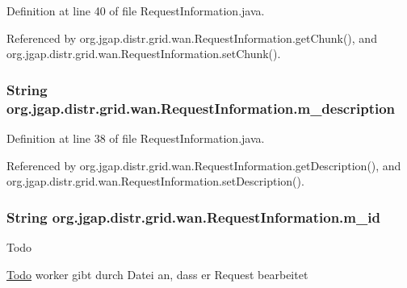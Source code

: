 Definition at line 40 of file Request\-Information.\-java.



Referenced by org.\-jgap.\-distr.\-grid.\-wan.\-Request\-Information.\-get\-Chunk(), and org.\-jgap.\-distr.\-grid.\-wan.\-Request\-Information.\-set\-Chunk().

\hypertarget{classorg_1_1jgap_1_1distr_1_1grid_1_1wan_1_1_request_information_a4ae87969350016cc47246496481c31c5}{
\subsubsection[{m\-\_\-description}]{\setlength{\rightskip}{0pt plus 5cm}String org.\-jgap.\-distr.\-grid.\-wan.\-Request\-Information.\-m\-\_\-description\hspace{0.3cm}{\ttfamily [private]}}}\label{classorg_1_1jgap_1_1distr_1_1grid_1_1wan_1_1_request_information_a4ae87969350016cc47246496481c31c5}


Definition at line 38 of file Request\-Information.\-java.



Referenced by org.\-jgap.\-distr.\-grid.\-wan.\-Request\-Information.\-get\-Description(), and org.\-jgap.\-distr.\-grid.\-wan.\-Request\-Information.\-set\-Description().

\hypertarget{classorg_1_1jgap_1_1distr_1_1grid_1_1wan_1_1_request_information_ab29bbb5cde83ff185ae2122f9f9a0147}{
\subsubsection[{m\-\_\-id}]{\setlength{\rightskip}{0pt plus 5cm}String org.\-jgap.\-distr.\-grid.\-wan.\-Request\-Information.\-m\-\_\-id\hspace{0.3cm}{\ttfamily [private]}}}\label{classorg_1_1jgap_1_1distr_1_1grid_1_1wan_1_1_request_information_ab29bbb5cde83ff185ae2122f9f9a0147}
\begin{DoxyRefDesc}{Todo}
\item[\hyperlink{todo__todo000107}{Todo}]worker gibt durch Datei an, dass er Request bearbeitet \end{DoxyRefDesc}


